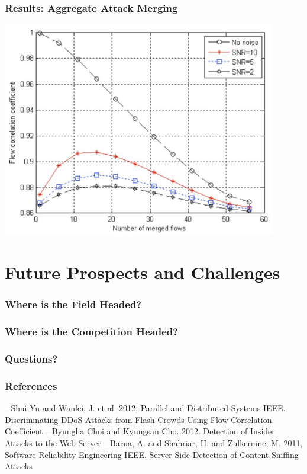 \documentclass[10pt,mathserif]{beamer}
\begin{document}
\begin{frame}
  \frametitle{Results: Aggregate Attack Merging}
  \includegraphics[width=0.9\textwidth,natwidth=1016,natheight=796]{figures/aggregate_attack.png}
\end{frame}

\section{Future Prospects and Challenges}

\begin{frame}
  \frametitle{Where is the Field Headed?} %

\end{frame}

\begin{frame}
  \frametitle{Where is the Competition Headed?} %

\end{frame}

\begin{frame}
  \frametitle{Questions?}
\end{frame}

\begin{frame}
  \frametitle{References}
  \begin{thebibliography}{}
   _Shui Yu and Wanlei, J. et al. 2012, Parallel and
    Distributed Systems IEEE. Discriminating DDoS Attacks from Flash
    Crowds Using Flow Correlation Coefficient
   _Byungha Choi and Kyungsan
    Cho. 2012. Detection of Insider Attacks to the Web Server
   _Barua,
    A. and Shahriar, H. and Zulkernine, M. 2011, Software Reliability
    Engineering IEEE. Server Side Detection of Content Sniffing Attacks
  \end{thebibliography}
\end{frame}
\end{document}
